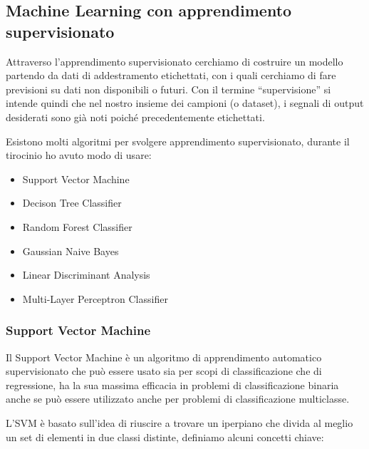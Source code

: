 \documentclass[12pt,italian]{report}
\begin{document}
\subsection{Machine Learning con apprendimento \\supervisionato}
\label{sec:apprendimento supervisionato}
Attraverso l’apprendimento supervisionato cerchiamo di costruire un modello partendo da dati di addestramento etichettati, con i quali cerchiamo di fare previsioni su dati non disponibili o futuri. Con il termine ``supervisione'' si intende quindi che nel nostro insieme dei campioni (o dataset), i segnali di output desiderati sono già noti poiché precedentemente etichettati.

Esistono molti algoritmi per svolgere apprendimento supervisionato, durante il tirocinio ho avuto modo di usare:
\begin{itemize}
	\item Support Vector Machine
	\item Decison Tree Classifier
	\item Random Forest Classifier
	\item Gaussian Naive Bayes
	\item Linear Discriminant Analysis
	\item Multi-Layer Perceptron Classifier
\end{itemize}

\subsubsection{Support Vector Machine}
\label{sec:SVC}
Il Support Vector Machine è un algoritmo di apprendimento automatico supervisionato che può essere usato sia per scopi di classificazione che di regressione, ha la sua massima efficacia in problemi di classificazione binaria anche se può essere utilizzato anche per problemi di classificazione multiclasse.

L'SVM è basato sull'idea di riuscire a trovare un iperpiano che divida al meglio un set di elementi in due classi distinte, definiamo alcuni concetti chiave:
\end{document}
